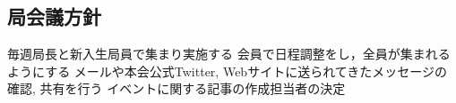 \subsection*{局会議方針}


毎週局長と新入生局員で集まり実施する
会員で日程調整をし，全員が集まれるようにする
メールや本会公式Twitter, Webサイトに送られてきたメッセージの確認, 共有を行う
イベントに関する記事の作成担当者の決定

